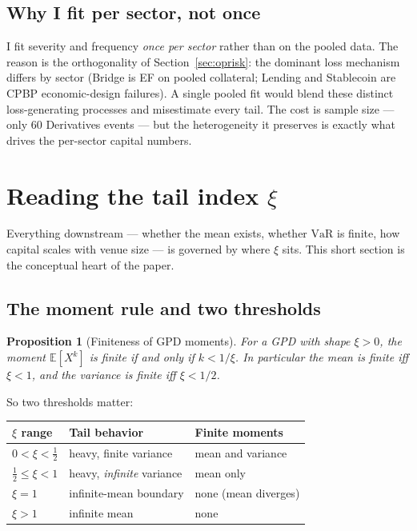 \documentclass[11pt]{article}
\newtheorem{proposition}[theorem]{Proposition}
\theoremstyle{definition}
\theoremstyle{remark}
\theoremstyle{definition}
\newcommand{\E}{\mathbb{E}}
\newcommand{\VaR}{\mathrm{VaR}}
\newcommand{\1}{\mathbf{1}}
\begin{document}
\subsection{Why I fit per sector, not once}\label{sec:persector}

I fit severity and frequency \emph{once per sector} rather than on the pooled
data. The reason is the orthogonality of Section~\ref{sec:oprisk}: the dominant loss
mechanism differs by sector (Bridge is EF on pooled collateral; Lending and
Stablecoin are CPBP economic-design failures). A single pooled fit would blend
these distinct loss-generating processes and misestimate every tail. The cost is
sample size --- only $60$ Derivatives events --- but the heterogeneity it
preserves is exactly what drives the per-sector capital numbers.

\section{Reading the tail index $\xi$}\label{sec:xi}

Everything downstream --- whether the mean exists, whether $\VaR$ is finite,
how capital scales with venue size --- is governed by where $\xi$ sits. This
short section is the conceptual heart of the paper.

\subsection{The moment rule and two thresholds}

\begin{proposition}[Finiteness of GPD moments]
For a GPD with shape $\xi>0$, the moment $\E[X^k]$ is finite if and only if
$k<1/\xi$. In particular the mean is finite iff $\xi<1$, and the variance is
finite iff $\xi<1/2$.
\end{proposition}

So two thresholds matter:

\begin{center}
\begin{tabular}{lll}
\toprule
$\xi$ range & Tail behavior & Finite moments \\
\midrule
$0<\xi<\tfrac12$ & heavy, finite variance & mean and variance \\
$\tfrac12\le\xi<1$ & heavy, \emph{infinite} variance & mean only \\
$\xi=1$ & infinite-mean boundary & none (mean diverges) \\
$\xi>1$ & infinite mean & none \\
\bottomrule
\end{tabular}
\end{center}
\end{document}
